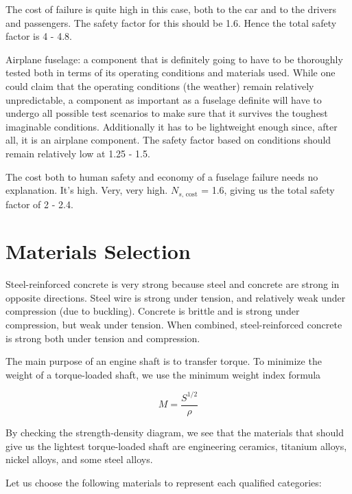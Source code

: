 \documentclass[
10pt,
a4paper,
openany,
svgnames,
]{book}
\begin{document}
\begin{evensolution}
  The cost of failure is quite high in this case, both to the car and to the drivers and passengers. The safety factor for this should be 1.6. Hence the total safety factor is 4 - 4.8.

\item Airplane fuselage: a component that is definitely going to have to be thoroughly tested both in terms of its operating conditions and materials used. While one could claim that the operating conditions (the weather) remain relatively unpredictable, a component as important as a fuselage definite will have to undergo all possible test scenarios to make sure that it survives the toughest imaginable conditions. Additionally it has to be lightweight enough since, after all, it is an airplane component. The safety factor based on conditions should remain relatively low at 1.25 - 1.5.

  The cost both to human safety and economy of a fuselage failure needs no explanation. It's high. Very, very high. $N_{s\text{, cost}}$ = 1.6, giving us the total safety factor of 2 - 2.4.
  
\end{evensolution}

\section{Materials Selection}

\begin{evensolution}
\item Steel-reinforced concrete is very strong because steel and concrete are strong in opposite directions. Steel wire is strong under tension, and relatively weak under compression (due to buckling). Concrete is brittle and is strong under compression, but weak under tension. When combined, steel-reinforced concrete is strong both under tension and compression.

\item The main purpose of an engine shaft is to transfer torque. To minimize the weight of a torque-loaded shaft, we use the minimum weight index formula

  \begin{equation*}
    M = \frac{S^{1/2}}{\rho}
  \end{equation*}

  By checking the strength-density diagram, we see that the materials that should give us the lightest torque-loaded shaft are engineering ceramics, titanium alloys, nickel alloys, and some steel alloys.

  Let us choose the following materials to represent each qualified categories:
\end{evensolution}
\end{document}
